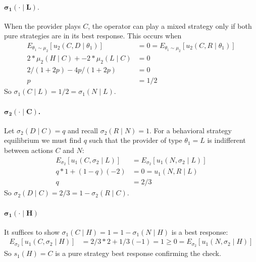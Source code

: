 \documentclass[11pt]{exam}
\begin{document}
\begin{questions}
\begin{parts}
        \paragraph{$\mathbf{\sigma_1(\cdot\mid L)}.$}
        When the provider plays $C$, the operator can play a mixed strategy only if both pure strategies are in its best response. This occurs when
        \begin{align*}
            E_{\theta_1\sim\mu_2}[u_2(C,D\mid \theta_1)] &= 0 
                = E_{\theta_1\sim\mu_2}[u_2(C,R\mid \theta_1)]\\
             2*\mu_2(H\mid C) + -2*\mu_2(L\mid C) &=0\\
             2/(1 + 2p) - 4p/(1 + 2p) &= 0\\
             p &= 1/2
        \end{align*}
        So $\sigma_1(C\mid L) = 1/2 = \sigma_1(N\mid L)$.

        \paragraph{$\mathbf{\sigma_2(\cdot\mid C)}$.}
        Let $\sigma_2(D\mid C) = q$ and recall $\sigma_2(R\mid N) = 1$. For a behavioral strategy equilibrium we must find $q$ such that the provider of type $\theta_1=L$ is indifferent between actions $C$ and $N$:        
        \begin{align*}
            E_{\sigma_2}[u_1(C,\sigma_2\mid L)] &= E_{\sigma_2}[u_1(N,\sigma_2\mid L)]\\
            q*1 + (1-q)(-2) &= 0 = u_1(N,R \mid L)\\
            q &= 2/3
        \end{align*}
        So $\sigma_2(D\mid C) = 2/3 = 1 - \sigma_2(R\mid C)$.

        \paragraph{$\mathbf{\sigma_1(\cdot\mid H)}$}
        It suffices to show $\sigma_1(C\mid H) = 1 = 1-\sigma_1(N\mid H)$ is a best response:
        \begin{align*}
            E_{\sigma_2}[u_1(C, \sigma_2\mid H)] &= 2/3 * 2 + 1/3(-1) = 1
            \ge 0 = E_{\sigma_2}[u_1(N, \sigma_2\mid H)]
        \end{align*}
        So $s_1(H) = C$ is a pure strategy best response confirming the check.  


\end{parts}
\end{questions}
\end{document}
